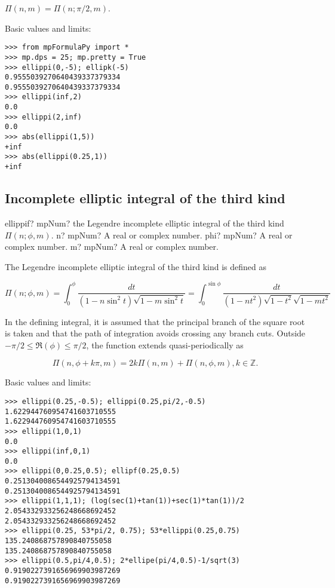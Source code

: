 $\Pi(n,m)=\Pi(n; \pi/2, m)$.


Basic values and limits:

\begin{lstlisting}
>>> from mpFormulaPy import *
>>> mp.dps = 25; mp.pretty = True
>>> ellippi(0,-5); ellipk(-5)
0.9555039270640439337379334
0.9555039270640439337379334
>>> ellippi(inf,2)
0.0
>>> ellippi(2,inf)
0.0
>>> abs(ellippi(1,5))
+inf
>>> abs(ellippi(0.25,1))
+inf
\end{lstlisting}





\subsection{Incomplete elliptic integral of the third kind}

\begin{mpFunctionsExtract}
	\mpFunctionThree
	{ellippif? mpNum? the Legendre incomplete elliptic integral of the third kind $\Pi(n;\phi,m)$.}
	{n? mpNum? A real or complex number.}	
	{phi? mpNum? A real or complex number.}
	{m? mpNum? A real or complex number.}	
\end{mpFunctionsExtract}


The Legendre incomplete elliptic integral of the third kind is defined as

\begin{equation}
\Pi(n;\phi,m)=\int_0^{\phi} \frac{dt}{(1-n \sin^2 t)\sqrt{1-m \sin^2 t}} = \int_0^{\sin \phi} \frac{dt}{(1-nt^2)\sqrt{1-t^2}\sqrt{1-mt^2}}
\end{equation}

\vpara
In the defining integral, it is assumed that the principal branch of the square root is taken and that the path of integration avoids crossing any branch cuts. Outside $-\pi/2 \leq \Re(\phi) \leq \pi/2$, the function extends quasi-periodically as

\begin{equation}
\Pi(n, \phi+k\pi,m) = 2k\Pi(n,m) + \Pi(n,\phi,m), k \in \mathbb{Z}.
\end{equation}


Basic values and limits:

\begin{lstlisting}
>>> ellippi(0.25,-0.5); ellippi(0.25,pi/2,-0.5)
1.622944760954741603710555
1.622944760954741603710555
>>> ellippi(1,0,1)
0.0
>>> ellippi(inf,0,1)
0.0
>>> ellippi(0,0.25,0.5); ellipf(0.25,0.5)
0.2513040086544925794134591
0.2513040086544925794134591
>>> ellippi(1,1,1); (log(sec(1)+tan(1))+sec(1)*tan(1))/2
2.054332933256248668692452
2.054332933256248668692452
>>> ellippi(0.25, 53*pi/2, 0.75); 53*ellippi(0.25,0.75)
135.240868757890840755058
135.240868757890840755058
>>> ellippi(0.5,pi/4,0.5); 2*ellipe(pi/4,0.5)-1/sqrt(3)
0.9190227391656969903987269
0.9190227391656969903987269
\end{lstlisting}

